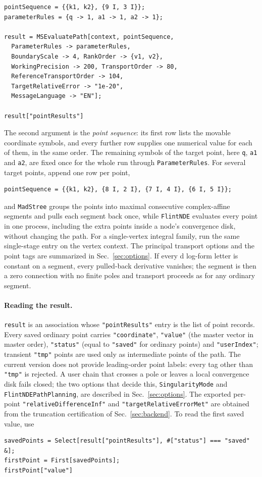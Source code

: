 \documentclass[11pt,a4paper]{article}
\numberwithin{table}{section}
\begin{document}
\begin{verbatim}
pointSequence = {{k1, k2}, {9 I, 3 I}};
parameterRules = {q -> 1, a1 -> 1, a2 -> 1};

result = MSEvaluatePath[context, pointSequence,
  ParameterRules -> parameterRules,
  BoundaryScale -> 4, RankOrder -> {v1, v2},
  WorkingPrecision -> 200, TransportOrder -> 80,
  ReferenceTransportOrder -> 104,
  TargetRelativeError -> "1e-20",
  MessageLanguage -> "EN"];

result["pointResults"]
\end{verbatim}
The second argument is the \emph{point sequence}: its first row lists the movable coordinate
symbols, and every further row supplies one numerical value for each of them, in the same order.
The remaining symbols of the target point, here \texttt{q}, \texttt{a1} and \texttt{a2}, are fixed
once for the whole run through \texttt{ParameterRules}. For several target points, append one row per
point,
\begin{verbatim}
pointSequence = {{k1, k2}, {8 I, 2 I}, {7 I, 4 I}, {6 I, 5 I}};
\end{verbatim}
and \texttt{MadStree} groups the
points into maximal consecutive complex-affine segments and pulls each segment back once, while
\texttt{FlintNDE} evaluates every point in one process, including the extra points inside a node's
convergence disk, without changing the path. For a single-vertex integral family, run the same
single-stage entry on the vertex context. The principal transport options and the point tags are
summarized in Sec.~\ref{sec:options}. If every d log-form letter is constant on a segment, every
pulled-back derivative vanishes; the segment is then a zero connection with no finite poles and
transport proceeds as for any ordinary segment.

\paragraph{Reading the result.}

\texttt{result} is an association whose \texttt{"pointResults"} entry is the list of point records.
Every saved ordinary point carries
\texttt{"coordinate"}, \texttt{"value"} (the master vector in master order), \texttt{"status"}
(equal to
\texttt{"saved"} for ordinary points) and \texttt{"userIndex"}; transient \texttt{"tmp"} points
are used only as intermediate points of the path. The current version does not provide leading-order
point labels: every tag other than \texttt{"tmp"} is rejected. A user chain that
crosses a pole or leaves a local convergence disk fails closed; the two options that decide this,
\texttt{SingularityMode} and \texttt{FlintNDEPathPlanning}, are described in
Sec.~\ref{sec:options}. The exported per-point
\texttt{"relativeDifferenceInf"} and \texttt{"targetRelativeErrorMet"} are obtained from the
truncation certification of Sec.~\ref{sec:backend}.
To read the first saved value, use
\begin{verbatim}
savedPoints = Select[result["pointResults"], #["status"] === "saved" &];
firstPoint = First[savedPoints];
firstPoint["value"]
\end{verbatim}
\end{document}
